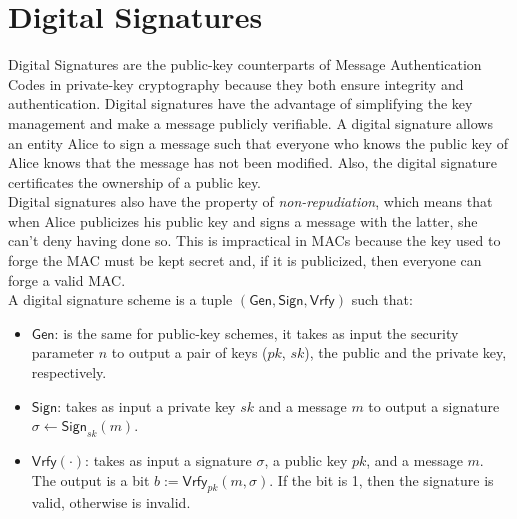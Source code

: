 \section{Digital Signatures}
Digital Signatures are the public-key counterparts of Message Authentication Codes in private-key cryptography because they both ensure integrity and authentication. Digital signatures have the advantage of simplifying the key management and make a message publicly verifiable.
A digital signature allows an entity Alice to sign a message such that everyone who knows the public key of Alice knows that the message has not been modified. Also, the digital signature certificates the ownership of a public key.\\
Digital signatures also have the property of \emph{non-repudiation}, which means that when Alice publicizes his public key and signs a message with the latter, she can't deny having done so. This is impractical in MACs because the key used to forge the MAC must be kept secret and, if it is publicized, then everyone can forge a valid MAC.\\
A digital signature scheme is a tuple $(\mathsf{Gen}, \mathsf{Sign}, \mathsf{Vrfy})$ such that:
\begin{itemize}
    \item{$\mathsf{Gen}$}: is the same for public-key schemes, it takes as input the security parameter $n$ to output a pair of keys ($pk$, $sk$), the public and the private key, respectively.
    \item{$\mathsf{Sign}$}: takes as input a private key $sk$ and a message $m$ to output a signature $\sigma \leftarrow \mathsf{Sign}_{sk}(m)$.
    \item{$\mathsf{Vrfy}(\cdot)$}: takes as input a signature $\sigma$, a public key $pk$, and a message $m$. The output is a bit $b := \mathsf{Vrfy}_{pk}(m, \sigma)$. If the bit is 1, then the signature is valid, otherwise is invalid.
\end{itemize}

